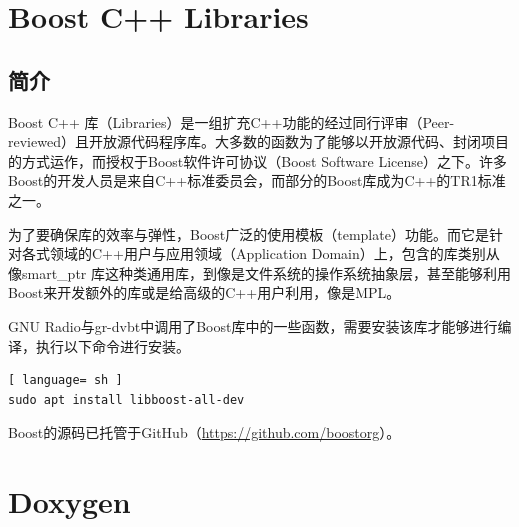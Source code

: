 	\section{Boost C++ Libraries}
		\subsection{简介}
			\par Boost C++ 库（Libraries）是一组扩充C++功能的经过同行评审（Peer-reviewed）且开放源代码程序库。大多数的函数为了能够以开放源代码、封闭项目的方式运作，而授权于Boost软件许可协议（Boost Software License）之下。许多Boost的开发人员是来自C++标准委员会，而部分的Boost库成为C++的TR1标准之一。
			\par 为了要确保库的效率与弹性，Boost广泛的使用模板（template）功能。而它是针对各式领域的C++用户与应用领域（Application Domain）上，包含的库类别从像smart\_ptr 库这种类通用库，到像是文件系统的操作系统抽象层，甚至能够利用Boost来开发额外的库或是给高级的C++用户利用，像是MPL。\cite{ wiki:Boost}
			\par GNU Radio与gr-dvbt中调用了Boost库中的一些函数，需要安装该库才能够进行编译，执行以下命令进行安装。
			\begin{lstlisting}[ language= sh ]
sudo apt install libboost-all-dev
			\end{lstlisting}
			\par Boost的源码已托管于GitHub（\href{https://github.com/boostorg}{https://github.com/boostorg}）。
	\section{Doxygen}
